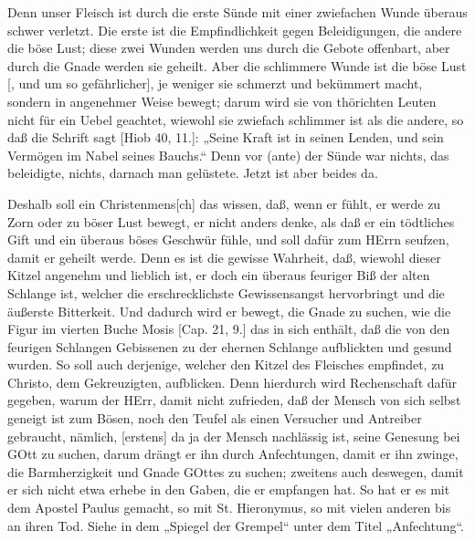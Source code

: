 Denn unser Fleisch ist durch die erste Sünde
mit einer zwiefachen Wunde überaus schwer verletzt. Die erste ist die Empfindlichkeit gegen Beleidigungen, die andere die böse Lust; diese zwei Wunden werden uns durch die Gebote offenbart, aber durch die Gnade werden sie geheilt. Aber die schlimmere Wunde ist die böse Lust [, und um so gefährlicher], je weniger sie schmerzt und bekümmert macht, sondern in angenehmer Weise bewegt; darum wird sie von thörichten Leuten nicht für ein Uebel geachtet, wiewohl sie zwiefach schlimmer ist als die andere, so daß die Schrift sagt [Hiob 40, 11.]: „Seine Kraft ist in seinen Lenden, und sein Vermögen im Nabel seines Bauchs.“ Denn vor (ante) der Sünde war nichts, das beleidigte, nichts, darnach man gelüstete. Jetzt ist aber beides da.

Deshalb soll ein Christenmens[ch] das wissen, daß, wenn er fühlt, er werde zu Zorn oder zu böser Lust bewegt, er nicht anders denke, als daß er ein tödtliches Gift und ein überaus böses Geschwür fühle, und soll dafür zum HErrn seufzen, damit er geheilt werde. Denn es ist die gewisse Wahrheit, daß, wiewohl dieser Kitzel angenehm und lieblich ist, er doch ein überaus feuriger Biß der alten Schlange ist, welcher die erschrecklichste Gewissensangst hervorbringt und die äußerste Bitterkeit. Und dadurch wird er bewegt, die Gnade zu suchen, wie die Figur im vierten Buche Mosis [Cap. 21, 9.] das in sich enthält, daß die von den feurigen Schlangen Gebissenen zu der ehernen Schlange aufblickten und gesund wurden. So soll auch derjenige, welcher den Kitzel des Fleisches empfindet, zu Christo, dem Gekreuzigten, aufblicken. Denn hierdurch wird Rechenschaft dafür gegeben, warum der HErr, damit nicht zufrieden, daß der Mensch von sich selbst geneigt ist zum Bösen, noch den Teufel als einen Versucher und Antreiber gebraucht, nämlich, [erstens] da ja der Mensch nachlässig ist, seine Genesung bei GOtt zu suchen, darum drängt er ihn durch Anfechtungen, damit er ihn zwinge, die Barmherzigkeit und Gnade GOttes zu suchen; zweitens auch deswegen, damit er sich nicht etwa erhebe in den Gaben, die er empfangen hat. So hat er es mit dem Apostel Paulus gemacht, so mit St. Hieronymus, so mit vielen anderen bis an ihren Tod. Siehe in dem „Spiegel der Grempel“ unter dem Titel „Anfechtung“.

